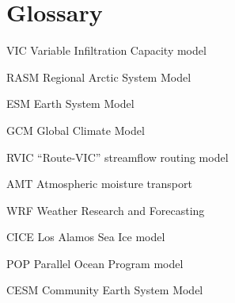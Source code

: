 %
%
\tableofcontents
\listoffigures
\listoftables

\chapter*{Glossary}      %
\thispagestyle{plain}
%
\begin{glossary}
\item[VIC] Variable Infiltration Capacity model
\item[RASM] Regional Arctic System Model
\item[ESM] Earth System Model
\item[GCM] Global Climate Model
\item[RVIC] ``Route-VIC'' streamflow routing model
\item[AMT] Atmospheric moisture transport
\item[WRF] Weather Research and Forecasting
\item[CICE] Los Alamos Sea Ice model
\item[POP] Parallel Ocean Program model
\item[CESM] Community Earth System Model
\end{glossary}

